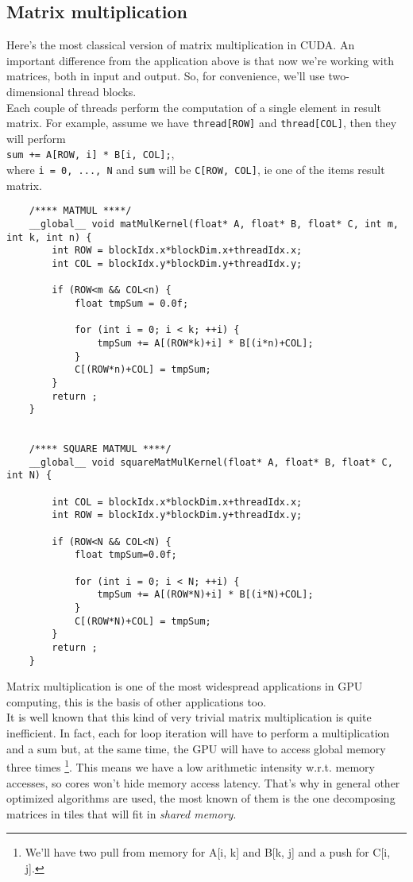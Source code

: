 \subsection{Matrix multiplication}
	Here's the most classical version of matrix multiplication in CUDA.
    An important difference from the application above is that now we're working with matrices, both in input and output. So, for convenience, we'll use two-dimensional thread blocks.\\  
	Each couple of threads perform the computation of a single element in result matrix. For example, assume we have \texttt{thread[ROW]} and \texttt{thread[COL]}, then they will perform\\ \texttt{sum += A[ROW, i] * B[i, COL];},\\ where \texttt{i = 0, ..., N} and \texttt{sum} will be \texttt{C[ROW, COL]}, ie one of the items result matrix.
	\begin{lstlisting}
	/**** MATMUL ****/
	__global__ void matMulKernel(float* A, float* B, float* C, int m, int k, int n) {   
		int ROW = blockIdx.x*blockDim.x+threadIdx.x;
		int COL = blockIdx.y*blockDim.y+threadIdx.y;
		
		if (ROW<m && COL<n) {
			float tmpSum = 0.0f;			
	
			for (int i = 0; i < k; ++i) {
				tmpSum += A[(ROW*k)+i] * B[(i*n)+COL];
			}        
			C[(ROW*n)+COL] = tmpSum;
		}
		return ;
	}
	
		
	/**** SQUARE MATMUL ****/
	__global__ void squareMatMulKernel(float* A, float* B, float* C, int N) {

		int COL = blockIdx.x*blockDim.x+threadIdx.x;
		int ROW = blockIdx.y*blockDim.y+threadIdx.y;
		
		if (ROW<N && COL<N) {
			float tmpSum=0.0f;        
		
			for (int i = 0; i < N; ++i) {
				tmpSum += A[(ROW*N)+i] * B[(i*N)+COL];
			}        
			C[(ROW*N)+COL] = tmpSum;        
		}
		return ;
	}
	\end{lstlisting}
	Matrix multiplication is one of the most widespread applications in GPU computing, this is the basis of other applications too.\\
	It is well known that this kind of very trivial matrix multiplication is quite inefficient. In fact, each for loop iteration will have to perform a multiplication and a sum but, at the same time, the GPU will have to access global memory three times \footnote{We'll have two pull from memory for A[i, k] and B[k, j] and a push for C[i, j].}.
	This means we have a low arithmetic intensity w.r.t. memory accesses, so cores won't hide memory access latency.
	That's why in general other optimized algorithms are used, the most known of them is the one decomposing matrices in tiles that will fit in \textit{shared memory}.
	

